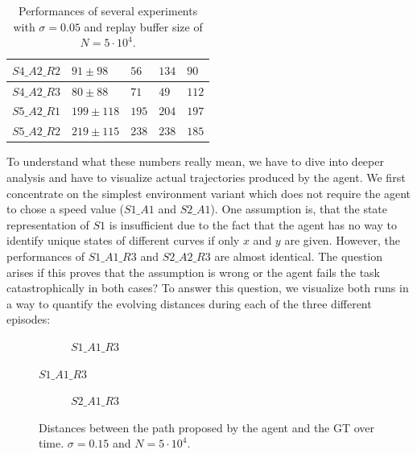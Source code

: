 \begin{table}[H]
\begin{tabular}{|l|l|l|l|l|}
{\color[HTML]{333333} $S4\_A2\_R2$}       & {\color[HTML]{333333} $91 \pm 98$}                & {\color[HTML]{333333} $56$}            & {\color[HTML]{333333} $134$}           & {\color[HTML]{333333} $90$}            \\ \hline
$S4\_A2\_R3$                              & $80 \pm 88$                                     & $71$                                  & $49$                                  & $112$                                  \\ \hline
$S5\_A2\_R1$                              & $199 \pm 118$                                     & $195$                                  & $204$                                  & $197$                                  \\ \hline
$S5\_A2\_R2$                              & $219 \pm 115$                                     & $238$                                  & $238$                                  & $185$                                  \\ \hline
\end{tabular}
\caption{ Performances of several experiments with $\sigma = 0.05$ and replay buffer size of $N=5 \cdot 10^4$.}
\label{tab:resultsK3}
\end{table}

To understand what these numbers really mean, we have to dive into deeper analysis and have to visualize actual trajectories produced by the agent. We first concentrate on the simplest environment variant which does not require the agent to chose a speed value ($S1\_A1$ and $S2\_A1$). One assumption is, that the state representation of $S1$ is insufficient due to the fact that the agent has no way to identify unique states of different curves if only $x$ and $y$ are given. However, the performances of $S1\_A1\_R3$ and $S2\_A2\_R3$ are almost identical. The question arises if this proves that the assumption is wrong or the agent fails the task catastrophically in both cases? To answer this question, we visualize both runs in a way to quantify the evolving distances during each of the three different episodes:
\par

\begin{figure}[H]
     \centering
     \begin{subfigure}[b]{0.9\textwidth}
         \centering
         
         \caption{$S1\_A1\_R3$}
     \end{subfigure}
\end{figure}
\begin{figure}\ContinuedFloat
     \begin{subfigure}[b]{0.9\textwidth}
         \centering
         
         \caption{$S2\_A1\_R3$}
     \end{subfigure}
        \caption{Distances between the path proposed by the agent and the GT over time. $\sigma = 0.15$ and $N=5\cdot 10^4$.}
        \label{fig:simpleCurves1}
\end{figure}

